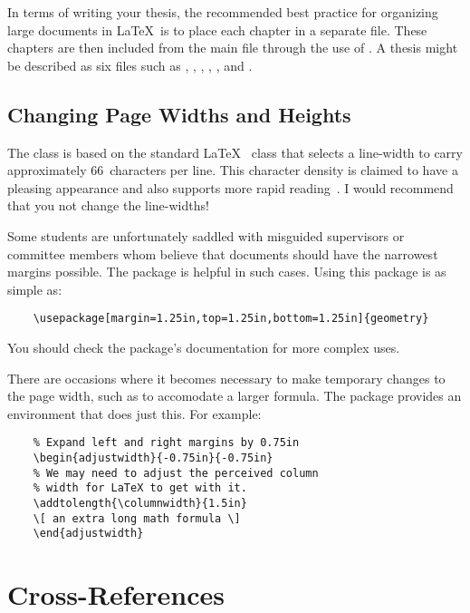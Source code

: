 In terms of writing your thesis, the recommended best practice for
organizing large documents in \LaTeX\ is to place each chapter in
a separate file.  These chapters are then included from the main
file through the use of \verb++.  A thesis might
be described as six files such as ,
, , ,
, and .


\subsection{Changing Page Widths and Heights}

The  class is based on the standard \LaTeX\ 
class that selects a line-width to carry approximately 66~characters
per line.  This character density is claimed to have a pleasing
appearance and also supports more rapid
reading~\cite{bringhurst-2002-teots}.  I would recommend that you
not change the line-widths!

Some students are unfortunately saddled with misguided supervisors
or committee members whom believe that documents should have the
narrowest margins possible.  The  package is
helpful in such cases.  Using this package is as simple as:
\begin{lstlisting}
    \usepackage[margin=1.25in,top=1.25in,bottom=1.25in]{geometry}
\end{lstlisting}
You should check the package's documentation for more complex uses.

There are occasions where it becomes necessary to make temporary
changes to the page width, such as to accomodate a larger formula. 
The  package provides an 
environment that does just this.  For example:
\begin{lstlisting}
    % Expand left and right margins by 0.75in
    \begin{adjustwidth}{-0.75in}{-0.75in}
    % We may need to adjust the perceived column
    % width for LaTeX to get with it.
    \addtolength{\columnwidth}{1.5in}
    \[ an extra long math formula \]
    \end{adjustwidth}
\end{lstlisting}

\section{Cross-References}
\label{sec:CrossReferences}

